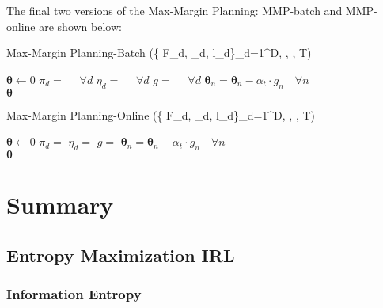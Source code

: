 \documentclass[11pt]{article}
\begin{document}
The final two versions of the Max-Margin Planning: MMP-batch and MMP-online are shown below:

\begin{algorithm}[H]
    \label{algo:mm_planning_batch}
    \caption{Max-Margin Planning-Batch (\{ F_d, \eta_d, l_d\}_{d=1}^D, \lambda, \alpha, T)}
    \begin{algorithmic}[1]
    \State $\boldsymbol\theta \leftarrow 0$
    \State $\pi_d =$  $\quad \forall d$
    \State $\eta_d = $  $\quad\forall d$
    \State $g = $  $ \quad\forall d$
    \State $\boldsymbol\theta_n = \boldsymbol\theta_n - \alpha_t \cdot g_n \quad\forall n$
    \EndFor \\
    \Return $\boldsymbol\theta$
    \end{algorithmic}
\end{algorithm}

\begin{algorithm}[H]
    \label{algo:mm_planning_online}
    \caption{Max-Margin Planning-Online (\{ F_d, \eta_d, l_d\}_{d=1}^D, \lambda, \alpha, T)}
    \begin{algorithmic}[1]
    \State $\boldsymbol\theta \leftarrow 0$
    \State $\pi_d =$ 
    \State $\eta_d = $  
    \State $g = $  
    \State $\boldsymbol\theta_n = \boldsymbol\theta_n - \alpha_t \cdot g_n \quad\forall n$
    \EndFor \\
    \Return $\boldsymbol\theta$
    \end{algorithmic}
\end{algorithm}




\newpage
\section{Summary}

\subsection{Entropy Maximization IRL}

\subsubsection{Information Entropy}
\end{document}
